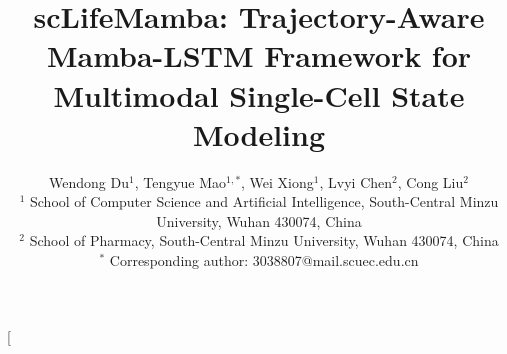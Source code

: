 \documentclass[11pt,twocolumn]{article}
\date{}
\begin{document}
\title{\textbf{scLifeMamba: Trajectory-Aware Mamba-LSTM Framework for Multimodal Single-Cell State Modeling}}

\author{
    Wendong Du$^{1}$,
    Tengyue Mao$^{1,*}$,
    Wei Xiong$^{1}$,
    Lvyi Chen$^{2}$,
    Cong Liu$^{2}$
    \\[0.5em]
    {\small
        $^{1}$ School of Computer Science and Artificial Intelligence,
        South-Central Minzu University, Wuhan 430074, China
    }
    \\
    {\small
        $^{2}$ School of Pharmacy,
        South-Central Minzu University, Wuhan 430074, China
    }
    \\[0.3em]
    {\small
        $^{*}$ Corresponding author: 3038807@mail.scuec.edu.cn
    }
}

\twocolumn[
\maketitle
\end{document}
